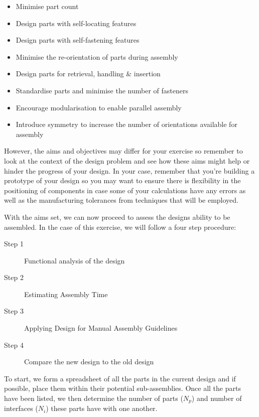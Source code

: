 \begin{itemize}
    \item Minimise part count
    \item Design parts with self-locating features
    \item Design parts with self-fastening features
    \item Minimise the re-orientation of parts during assembly
    \item Design parts for retrieval, handling \& insertion
    \item Standardise parts and minimise the number of fasteners
    \item Encourage modularisation to enable parallel assembly
    \item Introduce symmetry to increase the number of orientations available for assembly
\end{itemize}

However, the aims and objectives may differ for your exercise so remember to look at the context of the design problem and see how these aims might help or hinder the progress of your design. In your case, remember that you're building a prototype of your design so you may want to ensure there is flexibility in the positioning of components in case some of your calculations have any errors as well as the manufacturing tolerances from techniques that will be employed.

With the aims set, we can now proceed to assess the designs ability to be assembled. In the case of this exercise, we will follow a four step procedure:

\begin{description}
    \item[Step 1] Functional analysis of the design
    \item[Step 2] Estimating Assembly Time
    \item[Step 3] Applying Design for Manual Assembly Guidelines
    \item[Step 4] Compare the new design to the old design
\end{description}

To start, we form a spreadsheet of all the parts in the current design and if possible, place them within their potential sub-assemblies. Once all the parts have been listed, we then determine the number of parts ($N_p$) and number of interfaces ($N_i$) these parts have with one another. 

